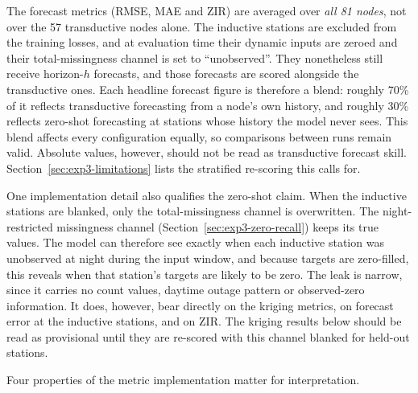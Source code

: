 The forecast metrics (RMSE, MAE and ZIR) are averaged over \emph{all
81 nodes}, not over the 57 transductive nodes alone. The inductive
stations are excluded from the training losses, and at evaluation time
their dynamic inputs are zeroed and their total-missingness channel is
set to ``unobserved''. They nonetheless still receive horizon-$h$
forecasts, and those forecasts are scored alongside the transductive
ones. Each headline forecast figure is therefore a blend: roughly
70\% of it reflects transductive forecasting from a node's own history,
and roughly 30\% reflects zero-shot forecasting at stations whose
history the model never sees. This blend affects every configuration
equally, so comparisons between runs remain valid. Absolute values,
however, should not be read as transductive forecast skill.
Section~\ref{sec:exp3-limitations} lists the stratified re-scoring this
calls for.

One implementation detail also qualifies the zero-shot claim. When the
inductive stations are blanked, only the total-missingness channel is
overwritten. The night-restricted missingness channel
(Section~\ref{sec:exp3-zero-recall}) keeps its true values. The model
can therefore see exactly when each inductive station was unobserved
at night during the input window, and because targets are zero-filled,
this reveals when that station's targets are likely to be zero. The
leak is narrow, since it carries no count values, daytime outage
pattern or observed-zero information. It does, however, bear directly
on the kriging metrics, on forecast error at the inductive stations,
and on ZIR. The kriging results below should be read as provisional
until they are re-scored with this channel blanked for held-out
stations.

Four properties of the metric implementation matter for interpretation.

